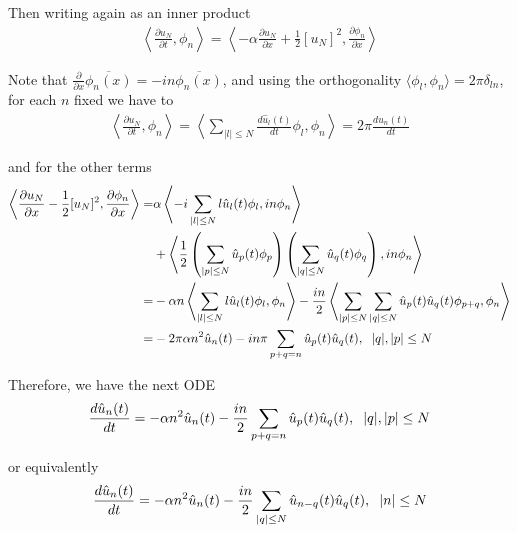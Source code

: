 		Then writing again as an inner product
		\begin{align*}
			\left\langle \frac{\partial u_N}{\partial t}, \phi_n  \right\rangle = \left\langle - \alpha \frac{\partial u_N}{\partial x} + \frac{1}{2} [u_N]^2, \frac{\partial \phi_n}{\partial x}  \right\rangle
		\end{align*}
		
		Note that $\frac{\partial}{\partial x} \overline{\phi_n (x)} = - in \overline{\phi_n (x)}$, and using the orthogonality $\langle \phi_l, \phi_n \rangle = 2 \pi \delta_{ln}$, for each $n$ fixed we have to
		\begin{align*}
			\left\langle \frac{\partial u_N}{\partial t}, \phi_n  \right\rangle = \left\langle \displaystyle \sum_{ |l| \leq N} \frac{d \hat{u}_l (t)}{dt} \phi_l, \phi_n  \right\rangle = 2 \pi \frac{d \hat{u}_n (t)}{dt}
		\end{align*}
		
		\noindent and for the other terms
		\begin{align*}
			\left\langle \frac{\partial u_N}{\partial x} - \frac{1}{2} [u_N]^2, \frac{\partial \phi_n}{\partial x}  \right\rangle = & \alpha \left\langle - i \displaystyle \sum_{ |l| \leq N} l \hat{u}_l (t) \phi_l, in \phi_n \right\rangle \\
			&+ \left\langle\frac{1}{2} \left( \sum_{ |p| \leq N} \hat{u}_p (t) \phi_p \right) \left( \sum_{ |q| \leq N} \hat{u}_q (t) \phi_q \right), in \phi_n \right\rangle \\
			=&  - \alpha n \left\langle  \displaystyle \sum_{ |l| \leq N} l \hat{u}_l (t) \phi_l, \phi_n \right\rangle - \frac{in}{2} \left\langle \sum_{ |p| \leq N} \sum_{ |q| \leq N} \hat{u}_p (t) \hat{u}_q (t) \phi_{p + q}, \phi_n \right \rangle \\
			=& -2 \pi \alpha n^2 \hat{u}_n (t) - in \pi \sum_{ p + q = n} \hat{u}_p (t) \hat{u}_q (t), \hspace{2mm} |q|, |p| \leq N
		\end{align*}
		
		\noindent Therefore, we have the next ODE
		\begin{align*}
			\frac{d \hat{u}_n (t)}{dt} = - \alpha n^2 \hat{u}_n (t) - \frac{in}{2}  \sum_{ p + q = n} \hat{u}_p (t) \hat{u}_q (t), \hspace{2mm} |q|, |p| \leq N 
		\end{align*}
		
		or equivalently
		\begin{align*}
			\frac{d \hat{u}_n (t)}{dt} = - \alpha n^2 \hat{u}_n (t) - \frac{in}{2}  \sum_{|q| \leq N} \hat{u}_{n - q} (t) \hat{u}_q (t), \hspace{2mm} |n| \leq N 
		\end{align*}
		
